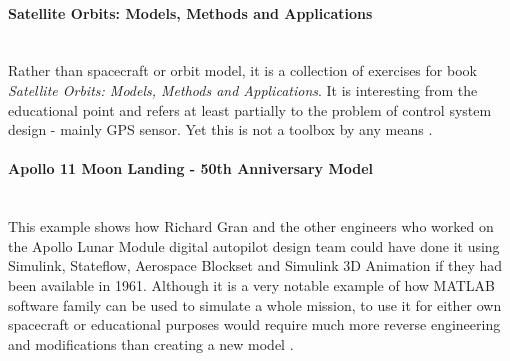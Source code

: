         \paragraph*{Satellite Orbits: Models, Methods and Applications}\hspace{0pt}\\
            Rather than spacecraft or orbit model, it is a collection of exercises for book \textit{Satellite Orbits: Models, Methods and Applications}. It is interesting from the educational point and refers at least partially to the problem of control system design - mainly GPS sensor. Yet this is not a toolbox by any means \cite{orbitsaddon}.
        
        \paragraph*{Apollo 11 Moon Landing - 50th Anniversary Model}\hspace{0pt}\\
            This example shows how Richard Gran and the other engineers who worked on the Apollo Lunar Module digital autopilot design team could have done it using Simulink, Stateflow, Aerospace Blockset and Simulink 3D Animation if they had been available in 1961. Although it is a very notable example of how MATLAB software family can be used to simulate a whole mission, to use it for either own spacecraft or educational purposes would require much more reverse engineering and modifications than creating a new model \cite{apollo}. 

